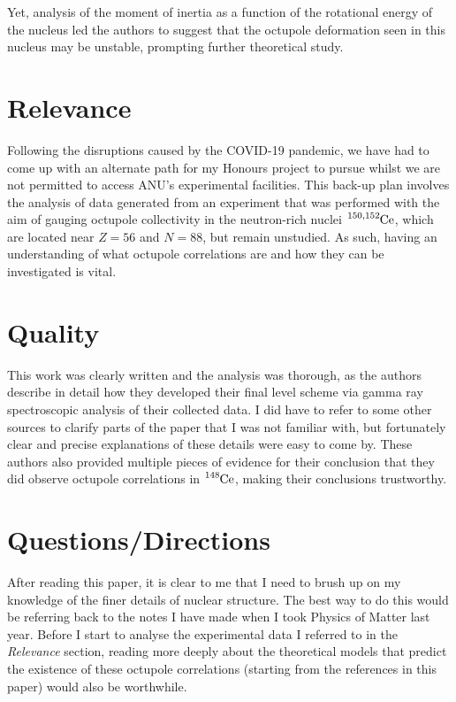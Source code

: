 \documentclass[12pt,a4paper]{article}
\begin{document}
\medskip
Yet, analysis of the moment of inertia as a function of the rotational energy of the nucleus led the authors to suggest that the octupole deformation seen in this nucleus may be unstable, prompting further theoretical study. 

\section*{Relevance}
Following the disruptions caused by the COVID-19 pandemic, we have had to come up with an alternate path for my Honours project to pursue whilst we are not permitted to access ANU's experimental facilities. This back-up plan involves the analysis of data generated from an experiment that was performed with the aim of gauging octupole collectivity in the neutron-rich nuclei $\ce{^{150,152}Ce}$, which are located near $Z=56$ and $N=88$, but remain unstudied. As such, having an understanding of what octupole correlations are and how they can be investigated is vital.

\section*{Quality}
This work was clearly written and the analysis was thorough, as the authors describe in detail how they developed their final level scheme via gamma ray spectroscopic analysis of their collected data. I did have to refer to some other sources to clarify parts of the paper that I was not familiar with, but fortunately clear and precise explanations of these details were easy to come by. These authors also provided multiple pieces of evidence for their conclusion that they did observe octupole correlations in $\ce{^{148}Ce}$, making their conclusions trustworthy.

\section*{Questions/Directions}
After reading this paper, it is clear to me that I need to brush up on my knowledge of the finer details of nuclear structure. The best way to do this would be referring back to the notes I have made when I took Physics of Matter last year. Before I start to analyse the experimental data I referred to in the \textit{Relevance} section, reading more deeply about the theoretical models that predict the existence of these octupole correlations (starting from the references in this paper) would also be worthwhile.

%
\end{document}
